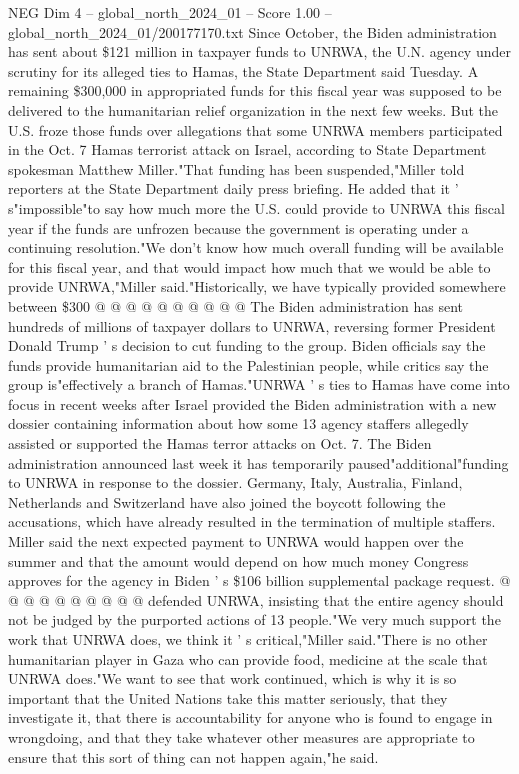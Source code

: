 \begin{textsample}{NEG Dim 4 – global\_north\_2024\_01 – Score 1.00 – global\_north\_2024\_01/200177170.txt}  \label{ex:f4_neg_111}
Since October, the Biden administration has sent about \$121 million in taxpayer funds to UNRWA, the U.N. agency under scrutiny for its alleged ties to Hamas, the State Department said Tuesday.
A remaining \$300,000 in appropriated funds for this fiscal year was supposed to be delivered to the humanitarian relief organization in the next few weeks.
But the U.S. froze those funds over allegations that some UNRWA members participated in the Oct. 7 Hamas terrorist attack on Israel, according to State Department spokesman Matthew Miller."That funding has been suspended,"Miller told reporters at the State Department daily press briefing.
He added that it ' s"impossible"to say how much more the U.S. could provide to UNRWA this fiscal year if the funds are unfrozen because the government is operating under a continuing resolution."We don't know how much overall funding will be available for this fiscal year, and that would impact how much that we would be able to provide UNRWA,"Miller said."Historically, we have typically provided somewhere between \$300 @ @ @ @ @ @ @ @ @ @ The Biden administration has sent hundreds of millions of taxpayer dollars to UNRWA, reversing former President Donald Trump ' s decision to cut funding to the group.
Biden officials say the funds provide humanitarian aid to the Palestinian people, while critics say the group is"effectively a branch of Hamas."UNRWA ' s ties to Hamas have come into focus in recent weeks after Israel provided the Biden administration with a new dossier containing information about how some 13 agency staffers allegedly assisted or supported the Hamas terror attacks on Oct. 7.
The Biden administration announced last week it has temporarily paused"additional"funding to UNRWA in response to the dossier.
Germany, Italy, Australia, Finland, Netherlands and Switzerland have also joined the boycott following the accusations, which have already resulted in the termination of multiple staffers.
Miller said the next expected payment to UNRWA would happen over the summer and that the amount would depend on how much money Congress approves for the agency in Biden ' s \$106 billion supplemental package request. @ @ @ @ @ @ @ @ @ @ defended UNRWA, insisting that the entire agency should not be judged by the purported actions of 13 people."We very much support the work that UNRWA does, we think it ' s critical,"Miller said."There is no other humanitarian player in Gaza who can provide food, medicine at the scale that UNRWA does."We want to see that work continued, which is why it is so important that the United Nations take this matter seriously, that they investigate it, that there is accountability for anyone who is found to engage in wrongdoing, and that they take whatever other measures are appropriate to ensure that this sort of thing can not happen again,"he said.

\end{textsample}
